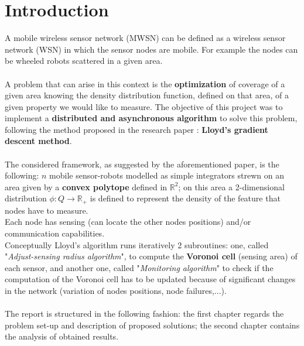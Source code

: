 \documentclass[a4paper,11pt,oneside]{book}
\begin{document}
	
	
	\tableofcontents \thispagestyle{empty}
	\listoffigures\thispagestyle{empty}
	
	\chapter*{Introduction}
	A mobile wireless sensor network (MWSN) can be defined as a wireless sensor network (WSN) in which the sensor nodes are mobile. For example the nodes can be wheeled robots scattered in a given area.\\\\
	
	A problem that can arise in this context is the \textbf{optimization} of coverage of a given area knowing the density distribution function, defined on that area, of a given property we would like to measure. The objective of this project was to implement a \textbf{distributed and asynchronous algorithm} to solve this problem, following the method proposed in the research paper \cite{K1}: \textbf{Lloyd's gradient descent method}. \\\\
	The considered framework, as suggested by the aforementioned paper, is the following: $n$ mobile sensor-robots modelled as simple integrators strewn on an area given by a \textbf{convex polytope} defined in $\mathbb{R}^2$; on this area a 2-dimensional distribution $\phi:Q\rightarrow \mathbb{R}_+$ is defined to represent the density of the feature that nodes have to measure.\\ Each node has sensing (can locate the other nodes positions) and/or communication capabilities.  \\
	Conceptually Lloyd's algorithm runs iteratively 2 subroutines: one, called "\emph{Adjust-sensing radius algorithm}", to compute the \textbf{Voronoi cell} (sensing area) of each sensor, and another one, called "\emph{Monitoring algorithm}" to check if the computation of the Voronoi cell has to be updated because of significant changes in the network (variation of nodes positions, node failures,...).\\\\
	The report is structured in the following fashion: the first chapter regards the problem set-up and description of proposed solutions; the second chapter contains the analysis of obtained results.\\  
	
\end{document}
